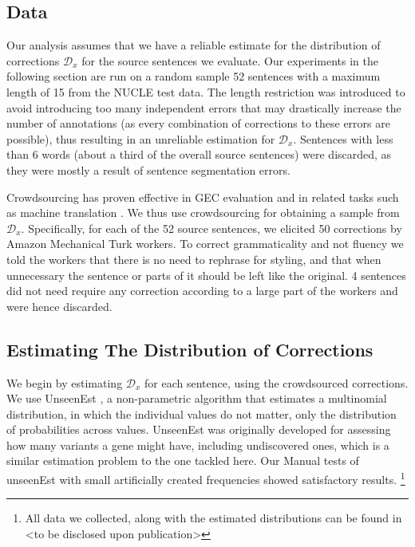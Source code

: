 \documentclass[letter,11pt]{article}
\begin{document}
\subsection{Data}

Our analysis assumes that we have a reliable estimate for the distribution of corrections
$\mathcal{D}_x$ for the source sentences we evaluate.
Our experiments in the following section are run on a random sample 52 sentences with a
maximum length of 15 from the NUCLE test data. 
The length restriction was introduced to avoid introducing too many independent
errors that may drastically increase the number of annotations
(as every combination of corrections to these errors are possible),
thus resulting in an unreliable estimation for $\mathcal{D}_x$.
Sentences with less than 6 words (about a third of the overall source sentences)
were discarded, as they were mostly a result of sentence segmentation errors.

Crowdsourcing has proven effective in 
GEC evaluation \cite{madnani2011they,napoles2015ground} and in related
tasks such as machine translation 
\cite{zaidan2011crowdsourcing,post2012constructing}.
We thus use crowdsourcing for obtaining a sample from $\mathcal{D}_x$. Specifically,
for each of the 52 source sentences, we elicited 50 corrections by Amazon Mechanical
Turk workers. To correct grammaticality and not fluency we told the workers that there is no need to rephrase for styling, and that when unnecessary the sentence or parts of it should be left like the original.
4 sentences did not need require any correction according to a large part of the workers and
were hence discarded.

\subsection{Estimating The Distribution of Corrections}

We begin by estimating $\mathcal{D}_x$ for each sentence, using the crowdsourced
corrections.
We use {\sc UnseenEst} \cite{zou2015quantifying}, a non-parametric algorithm that
estimates a multinomial distribution,
in which the individual values do not matter, only the distribution of probabilities
across values.%
{\sc UnseenEst} was originally developed for assessing how many
variants a gene might have, including undiscovered ones, which is a similar
estimation problem to the one tackled here.
Our Manual tests of unseenEst with small artificially created frequencies showed satisfactory results.
\footnote{All data we collected, along with the estimated
  distributions can be found in <to be disclosed upon publication>}
\end{document}

